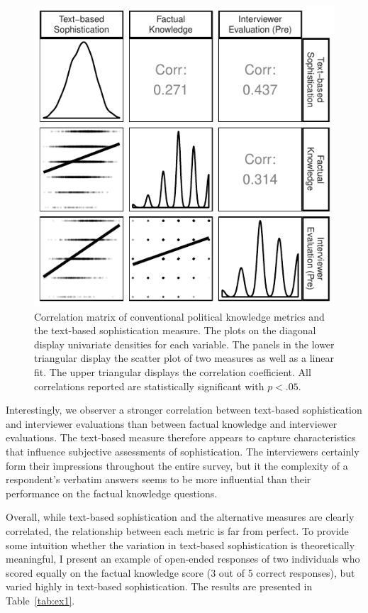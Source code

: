 \documentclass[12pt]{article}
\begin{document}
\begin{figure}[h]\centering
\includegraphics{../fig/corplot_pres.pdf}
\caption{Correlation matrix of conventional political knowledge metrics and the text-based sophistication measure. The plots on the diagonal display univariate densities for each variable. The panels in the lower triangular display the scatter plot of two measures as well as a linear fit. The upper triangular displays the correlation coefficient. All correlations reported are statistically significant with $p<.05$.}\label{fig:corplot}
\end{figure}

Interestingly, we observer a stronger correlation between text-based sophistication and interviewer evaluations than between factual knowledge and interviewer evaluations. The text-based measure therefore appears to capture characteristics that influence subjective assessments of sophistication. The interviewers certainly form their impressions throughout the entire survey, but it the complexity of a respondent's verbatim answers seems to be more influential than their performance on the factual knowledge questions.

Overall, while text-based sophistication and the alternative measures are clearly correlated, the relationship between each metric is far from perfect. To provide some intuition whether the variation in text-based sophistication is theoretically meaningful, I present an example of open-ended responses of two individuals who scored equally on the factual knowledge score (3 out of 5 correct responses), but varied highly in text-based sophistication. The results are presented in Table~\ref{tab:ex1}.
\end{document}
